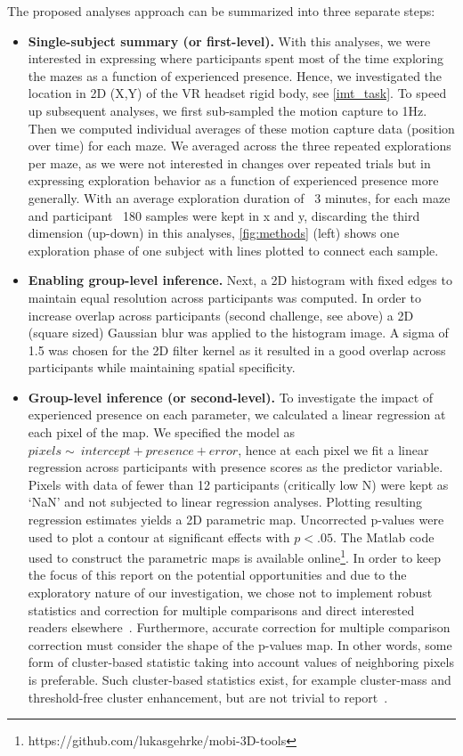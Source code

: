 The proposed analyses approach can be summarized into three separate steps:
\begin{itemize}
    \item \textbf{Single-subject summary (or first-level).} With this analyses, we were interested in expressing where participants spent most of the time exploring the mazes as a function of experienced presence. Hence, we investigated the location in 2D (X,Y) of the VR headset rigid body, see \ref{imt_task}. To speed up subsequent analyses, we first sub-sampled the motion capture to 1Hz. Then we computed individual averages of these motion capture data (position over time) for each maze. We averaged across the three repeated explorations per maze, as we were not interested in changes over repeated trials but in expressing exploration behavior as a function of experienced presence more generally. With an average exploration duration of ~3 minutes, for each maze and participant ~180 samples were kept in x and y, discarding the third dimension (up-down) in this analyses, \ref{fig:methods} (left) shows one exploration phase of one subject with lines plotted to connect each sample.
    \item \textbf{Enabling group-level inference.} Next, a 2D histogram with fixed edges to maintain equal resolution across participants was computed. In order to increase overlap across participants (second challenge, see above) a 2D (square sized) Gaussian blur was applied to the histogram image. A sigma of 1.5 was chosen for the 2D filter kernel as it resulted in a good overlap across participants while maintaining spatial specificity.
    \item \textbf{Group-level inference (or second-level).} To investigate the impact of experienced presence on each parameter, we calculated a linear regression at each pixel of the map. We specified the model as $pixels \sim\ intercept + presence + error$, hence at each pixel we fit a linear regression across participants with presence scores as the predictor variable. Pixels with data of fewer than 12 participants (critically low N) were kept as `NaN' and not subjected to linear regression analyses. Plotting resulting regression estimates yields a 2D parametric map. Uncorrected p-values were used to plot a contour at significant effects with $p < .05$. The Matlab code used to construct the parametric maps is available online\footnote{https://github.com/lukasgehrke/mobi-3D-tools}. In order to keep the focus of this report on the potential opportunities and due to the exploratory nature of our investigation, we chose not to implement robust statistics and correction for multiple comparisons and direct interested readers elsewhere~\cite{Pernet2011, Wilcox2016a}. Furthermore, accurate correction for multiple comparison correction must consider the shape of the p-values map. In other words, some form of cluster-based statistic taking into account values of neighboring pixels is preferable. Such cluster-based statistics exist, for example cluster-mass and threshold-free cluster enhancement, but are not trivial to report~\cite{Pernet2015}.
\end{itemize}
